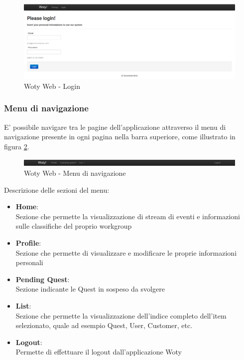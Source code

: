 \begin{center}
\begin{figure}[H]
\centering
\includegraphics[scale=0.35]{images/wotyWeb/login.png}
\caption{Woty Web - Login}
\label{ww-login}
\end{figure}
\end{center}



\subsubsection{Menu di navigazione}
E' possibile navigare tra le pagine dell'applicazione attraverso il menu di navigazione presente in ogni pagina nella barra superiore, come illustrato in figura \ref{ww-menu}.

\begin{center}
\begin{figure}[H]
\centering
\includegraphics[scale=0.35]{images/wotyWeb/menu.png}
\caption{Woty Web - Menu di navigazione}
\label{ww-menu}
\end{figure}
\end{center}


Descrizione delle sezioni del menu:
\begin{itemize}
\item \textbf{Home}:\\
Sezione che permette la visualizzazione di stream di eventi e informazioni sulle classifiche del proprio workgroup

\item \textbf{Profile}:\\
Sezione che permette di visualizzare e modificare le proprie informazioni personali

\item \textbf{Pending Quest}:\\
Sezione indicante le Quest in sospeso da svolgere

\item \textbf{List}:\\
Sezione che permette la visualizzazione dell'indice completo dell'item selezionato, quale ad esempio Quest, User, Customer, etc.

\item \textbf{Logout}:\\
Permette di effettuare il logout dall'applicazione Woty
\end{itemize}


